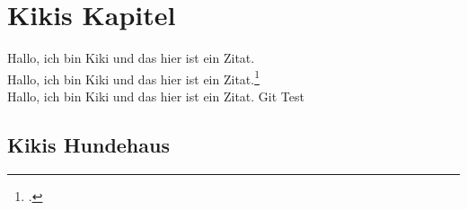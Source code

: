 \maketitle

\chapter{Kikis Kapitel}
Hallo, ich bin Kiki und das hier ist ein Zitat.\autocite{seiter2017business}\\
Hallo, ich bin Kiki und das hier ist ein Zitat.\footcite{seiter2017business}\\
Hallo, ich bin Kiki und das hier ist ein Zitat.\citeauthor{elk}
Git Test
\blindtext[4]
\section{Kikis Hundehaus}


\printbibliography[nottype=online] 
\printbibliography[type=online, title={Internetquellen}] 
